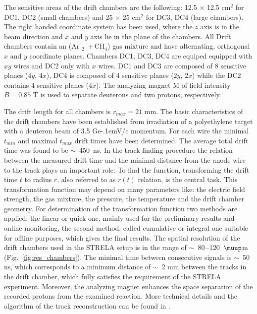 \documentclass[twocolumn,epjc3]{svjour3}
\newcommand{\GeVc}   {Ge\kern-.1emV/c\xspace}
\providecommand{\DIFaddtex}[1]{{\protect\color{Green} \sf #1}} %
\providecommand{\DIFdeltex}[1]{{\protect\color{Red} \scriptsize #1}} %
\providecommand{\DIFaddbegin}{} %
\providecommand{\DIFaddend}{} %
\providecommand{\DIFdelbegin}{} %
\providecommand{\DIFdelend}{} %
\providecommand{\DIFadd}[1]{\texorpdfstring{\DIFaddtex{#1}}{#1}} %
\providecommand{\DIFdel}[1]{\texorpdfstring{\DIFdeltex{#1}}{}} %
\newcommand{\DIFscaledelfig}{0.5}
\newlength{\DIFdelgraphicswidth} %
\newlength{\DIFdelgraphicsheight} %
\newcommand{\DIFaddincludegraphics}[2][]{{\color{blue}\fbox{\DIFOincludegraphics[#1]{#2}}}} %
\newcommand{\DIFdelincludegraphics}[2][]{%
\sbox{\DIFdelgraphicsbox}{\DIFOincludegraphics[#1]{#2}}%
\settoboxwidth{\DIFdelgraphicswidth}{\DIFdelgraphicsbox} %
\settoboxtotalheight{\DIFdelgraphicsheight}{\DIFdelgraphicsbox} %
\scalebox{\DIFscaledelfig}{%
\parbox[b]{\DIFdelgraphicswidth}{\usebox{\DIFdelgraphicsbox}\\[-\baselineskip] \rule{\DIFdelgraphicswidth}{0em}}\llap{\resizebox{\DIFdelgraphicswidth}{\DIFdelgraphicsheight}{%
\setlength{\unitlength}{\DIFdelgraphicswidth}%
\begin{picture}(1,1)%
\thicklines\linethickness{2pt} %
{\color[rgb]{1,0,0}\put(0,0){\framebox(1,1){}}}%
{\color[rgb]{1,0,0}\put(0,0){\line( 1,1){1}}}%
{\color[rgb]{1,0,0}\put(0,1){\line(1,-1){1}}}%
\end{picture}%
}\hspace*{3pt}}} %
} %
\DeclareRobustCommand{\DIFaddbegin}{\DIFOaddbegin \let\includegraphics\DIFaddincludegraphics} %
\DeclareRobustCommand{\DIFaddend}{\DIFOaddend \let\includegraphics\DIFOincludegraphics} %
\DeclareRobustCommand{\DIFdelbegin}{\DIFOdelbegin \let\includegraphics\DIFdelincludegraphics} %
\DeclareRobustCommand{\DIFdelend}{\DIFOaddend \let\includegraphics\DIFOincludegraphics} %
\begin{document}
\DIFdelend The sensitive areas of the drift chambers are the following: 12.5 $\times$ 12.5
cm$^2$ for DC1, DC2 (small chambers) and 25 $\times$ 25 cm$^2$ for DC3, DC4
(large chambers). The right handed coordinate system has been used, where the
$z$ axis is in the beam direction and $x$ and $y$ axis lie in the plane of the
chambers. \DIFdelbegin \DIFdel{All }\DIFdelend \DIFaddbegin \DIFadd{Drift }\DIFaddend chambers contain an (Ar\DIFdelbegin \DIFdel{$_2$}\DIFdelend \DIFaddbegin \DIFadd{\,+\,}\DIFaddend CH$_4$) gas mixture and have
alternating, orthogonal $x$ and $y$ coordinate planes. Chambers DC1, DC3, DC4
are \DIFdelbegin \DIFdel{equiped }\DIFdelend \DIFaddbegin \DIFadd{equipped }\DIFaddend with $xy$ wires and DC2 only with $x$ wires. DC1 and DC3 are
composed of 8 sensitive planes ($4y$, $4x$), DC4 is composed of 4 sensitive
planes ($2y$, $2x$) while the DC2 contains 4 sensitive planes ($4x$).
\DIFdelbegin \DIFdel{The
analyzing magnet M of field intensity $B = 0.85$ T is used to separate deuterons
and two protons, respectively.
}\DIFdelend 

The drift length for all chambers is $r_{max} = 21$ mm. The basic
characteristics of the drift chambers have been established from irradiation of
a polyethylene target with a deuteron beam of 3.5 \GeVc momentum. For each wire
the minimal $t_{min}$ and maximal $t_{max}$ drift times have been
determined. The average total drift time was found to be $\sim$~450~ns. In the
track finding procedure the relation between the measured drift time and the
minimal distance from the anode wire to the track plays an important role. To
find the function, transforming the drift time $t$ to radius $r$, also referred
to as $r(t)$ relation, is the central task. This transformation function may
depend on many parameters like: the electric field strength, the gas mixture,
the pressure, the temperature and the drift chamber geometry. For determination
of the transformation function two methods are applied: the linear or quick one,
mainly used for the preliminary results and online monitoring, the second
method, called cumulative or integral one suitable for offline purposes, which
gives the final results. The spatial resolution of the drift chambers used in
the STRELA setup is in the range of $\sim$~80\,--120~$\muup$m
(Fig.~\ref{fig:res_chambers}). \DIFaddbegin \DIFadd{The minimal time between consecutive signals is
$\sim$~50 ns, which corresponds to a minimum distance of $\sim$~2 mm between the
tracks in the drift chamber, which fully satisfies the requirement of the STRELA
experiment. Moreover, the analyzing magnet enhances the space separation of the
recorded protons from the examined reaction. }\DIFaddend More technical details and the
algorithm of the track reconstruction can be found in \cite{gla13}.
\end{document}
